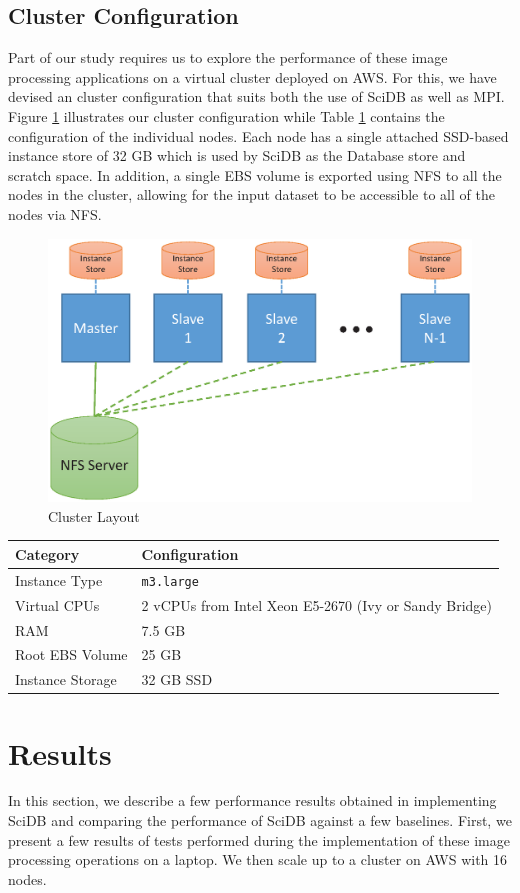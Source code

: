 \documentclass[letterpaper,twocolumn,10pt]{article}
\begin{document}
\subsection{Cluster Configuration}
Part of our study requires us to explore the performance of these image processing applications on a virtual cluster deployed on AWS. For this, we have devised an cluster configuration that suits both the use of SciDB as well as MPI. Figure \ref{fig:cluster} illustrates our cluster configuration while Table \ref{tab:config} contains the configuration of the individual nodes. Each node has a single attached SSD-based instance store of 32 GB which is used by SciDB as the Database store and scratch space. In addition, a single EBS volume is exported using NFS to all the nodes in the cluster, allowing for the input dataset to be accessible to all of the nodes via NFS.


\begin{figure}[h]
\centering
\includegraphics[width=.45\textwidth]{figures/scidb_cluster.eps}
\caption{Cluster Layout}
\label{fig:cluster}
\end{figure}

\begin{table} \label{tab:config}
\begin{tabular}{|l|p{3cm}|}
\hline
\textbf{Category} & \textbf{Configuration}  \\
\hline
Instance Type     & \texttt{m3.large}                                                        \\
Virtual CPUs      & 2 vCPUs from Intel Xeon E5-2670 (Ivy or Sandy Bridge) \\
RAM               & 7.5 GB                                                          \\
Root EBS Volume   & 25 GB                                                           \\
Instance Storage  & 32 GB SSD \\
\hline
\end{tabular}
\end{table}

\section{Results}\label{sec:results}
In this section, we describe a few performance results obtained in implementing SciDB and comparing the performance of SciDB against a few baselines. First, we present a few results of tests performed during the implementation of these image processing operations on a laptop. We then scale up to a cluster on AWS with 16 nodes.
\end{document}
